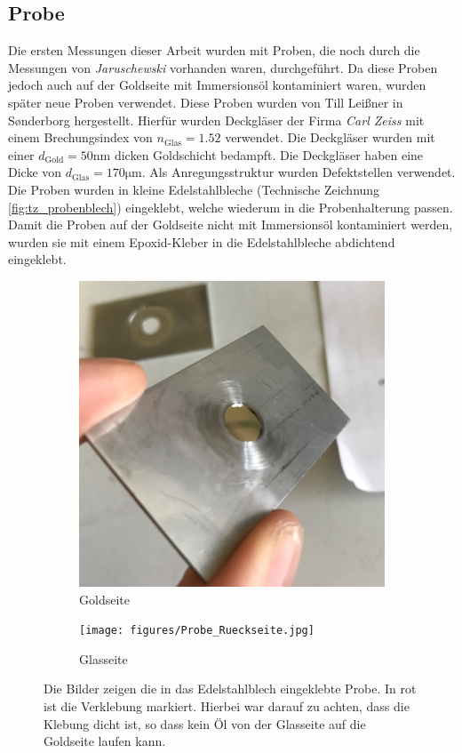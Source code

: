 \documentclass[titlepage,  ngerman]{article}
\begin{document}
	\subsection{Probe}
	Die ersten Messungen dieser Arbeit wurden mit Proben, die noch durch die Messungen von \textit{Jaruschewski} \cite{Jaruschewski.2020} vorhanden waren, durchgeführt. Da diese Proben jedoch auch auf der Goldseite mit Immersionsöl kontaminiert waren, wurden später neue Proben verwendet. Diese Proben wurden von Till Leißner in S\o nderborg hergestellt. Hierfür wurden Deckgläser der Firma \textit{Carl Zeiss} mit einem Brechungsindex von $n_{\mathrm{Glas}}= 1.52$ verwendet. Die Deckgläser wurden mit einer $d_{\mathrm{Gold}} = 50\mathrm{nm}$ dicken Goldschicht bedampft. Die Deckgläser haben eine Dicke von $d_{\mathrm{Glas}} = 170 \mathrm{\mu m}$. Als Anregungsstruktur wurden Defektstellen verwendet. Die Proben wurden in kleine Edelstahlbleche (Technische Zeichnung \ref{fig:tz_probenblech}) eingeklebt, welche wiederum in die Probenhalterung passen. Damit die Proben auf der Goldseite nicht mit Immersionsöl kontaminiert werden, wurden sie mit einem Epoxid-Kleber in die Edelstahlbleche abdichtend eingeklebt.
	\begin{figure}
		\centering
		\begin{subfigure}[b]{0.4\textwidth}
			\centering
			\includegraphics[width=\textwidth]{figures/Probe_Vorderseite.jpg}
			\caption{Goldseite}
			\label{fig:probe_vorderseite}
		\end{subfigure}
		\hfill
		\begin{subfigure}[b]{0.4\textwidth}
			\centering
			\texttt{[image: figures/Probe\_Rueckseite.jpg]}
			\caption{Glasseite}
			\label{fig:probe_rueckseite}
		\end{subfigure}
		\caption[Eingeklebte Probe]{Die Bilder zeigen die in das Edelstahlblech eingeklebte Probe. In rot ist die Verklebung markiert. Hierbei war darauf zu achten, dass die Klebung dicht ist, so dass kein Öl von der Glasseite auf die Goldseite laufen kann.}
		\label{fig:probe}
	\end{figure}
\end{document}

